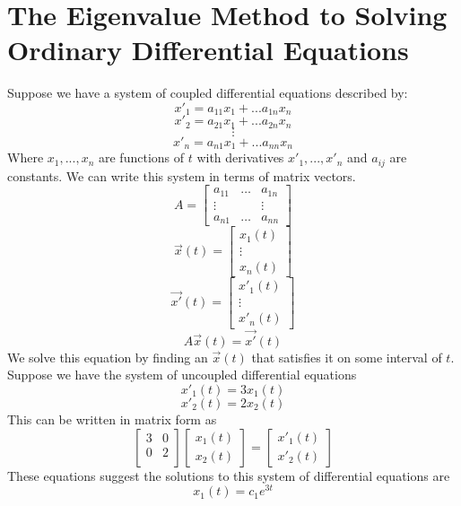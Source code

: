 {\section{The Eigenvalue Method to Solving Ordinary Differential Equations}
Suppose we have a system of coupled differential equations described by:
\[x'_1 = a_{11}x_1 + ...a_{1n}x_n\]
\[x'_2 = a_{21}x_1 + ...a_{2n}x_n\]
\[\vdots\]
\[x'_n = a_{n1}x_1 + ...a_{nn}x_n\]
Where $x_1,...,x_n$ are functions of $t$ with derivatives $x'_1,...,x'_n$ and $a_{ij}$ are constants. We can write this system in terms of matrix vectors.
\[A = \begin{bmatrix} 
a_{11} & \hdots & a_{1n} \\ 
\vdots & & \vdots \\ 
a_{n1} & \hdots & a_{nn} 
\end{bmatrix} \]
\[\vec{x}(t) = \begin{bmatrix} 
x_1(t) \\
\vdots \\
x_n(t) \end{bmatrix}\]
\[\vec{x'}(t) = \begin{bmatrix} 
x'_1(t) \\
\vdots \\
x'_n(t) \end{bmatrix}\]
\[A\vec{x}(t) = \vec{x'}(t)\]
We solve this equation by finding an $\vec{x}(t)$ that satisfies it on some interval of $t$.
Suppose we have the system of uncoupled differential equations
\[x'_1(t) = 3x_1(t)\]
\[x'_2(t) = 2x_2(t)\]
This can be written in matrix form as
\[\begin{bmatrix}
    3 & 0 \\
    0 & 2 \\
\end{bmatrix}
\begin{bmatrix}
    x_1(t) \\
    x_2(t)
\end{bmatrix} = \begin{bmatrix} 
x'_1(t) \\
x'_2(t) 
\end{bmatrix}\]
These equations suggest the solutions to this system of differential equations are 
\[x_1(t) = c_1e^{3t}\]
}
